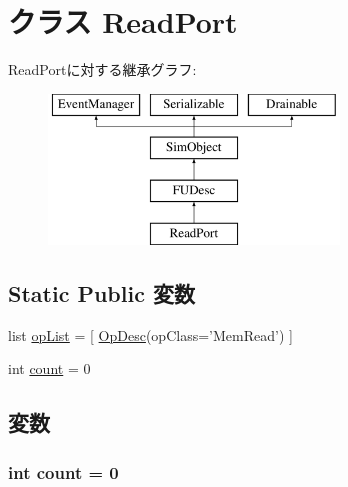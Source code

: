 \hypertarget{classFuncUnitConfig_1_1ReadPort}{
\section{クラス ReadPort}
\label{classFuncUnitConfig_1_1ReadPort}
}
ReadPortに対する継承グラフ:\begin{figure}[H]
\begin{center}
\leavevmode
\includegraphics[height=4cm]{classFuncUnitConfig_1_1ReadPort}
\end{center}
\end{figure}
\subsection*{Static Public 変数}
\begin{DoxyCompactItemize}
\item 
list \hyperlink{classFuncUnitConfig_1_1ReadPort_a31b2f9e3ac9a504397b140f513c469cc}{opList} = \mbox{[} \hyperlink{classOpDesc}{OpDesc}(opClass='MemRead') \mbox{]}
\item 
int \hyperlink{classFuncUnitConfig_1_1ReadPort_ad43c3812e6d13e0518d9f8b8f463ffcf}{count} = 0
\end{DoxyCompactItemize}


\subsection{変数}
\hypertarget{classFuncUnitConfig_1_1ReadPort_ad43c3812e6d13e0518d9f8b8f463ffcf}{
\subsubsection[{count}]{\setlength{\rightskip}{0pt plus 5cm}int {\bf count} = 0}}
\label{classFuncUnitConfig_1_1ReadPort_ad43c3812e6d13e0518d9f8b8f463ffcf}


